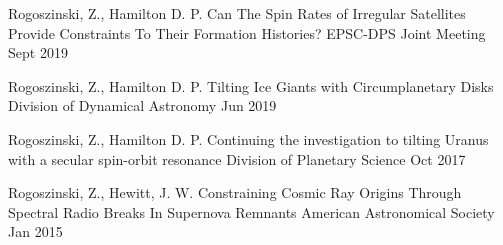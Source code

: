 \documentclass[]{awesome-cv}
\begin{document}
\begin{cventries}
	\cventry
	{Rogoszinski, Z., Hamilton D. P.}
	{Can The Spin Rates of Irregular Satellites Provide Constraints To Their Formation Histories? }
	{EPSC-DPS Joint Meeting}
	{Sept 2019}
	{}
	
	\vspace{-5mm}
	\cventry
	{Rogoszinski, Z., Hamilton D. P.}
	{{Tilting Ice Giants with Circumplanetary Disks}}
	{Division of Dynamical Astronomy}
	{Jun 2019}
	{}
	
	
	\vspace{-5mm}
	\cventry
	{Rogoszinski, Z., Hamilton D. P.}
	{{Continuing the investigation to tilting Uranus with a secular spin-orbit resonance}}
	{Division of Planetary Science }
	{Oct 2017}
	{}	
	
	\vspace{-5mm}
	\cventry
	{Rogoszinski, Z., Hewitt, J. W.}
	{Constraining Cosmic Ray Origins Through Spectral Radio Breaks In Supernova Remnants }
	{American Astronomical Society}
	{Jan 2015}
	{}
	
	\vspace{-5mm}
\end{cventries}



%	
\end{document}
